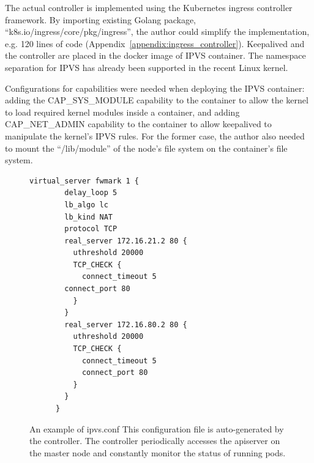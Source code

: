 The actual controller \cite{ktaka_ccmp_2017_826894} is implemented using the Kubernetes ingress controller \cite{K8sIngress2017} framework. 
By importing existing Golang package, \enquote{k8s.io/ingress/core/pkg/ingress}, the author could simplify the implementation, e.g. 
120 lines of code (Appendix~\ref{appendix:ingress_controller}).
%
Keepalived and the controller are placed in the docker image of IPVS container.
The namespace separation for IPVS has already been supported in the recent Linux kernel. 

Configurations for capabilities were needed when deploying the IPVS container: adding the CAP\_SYS\_MODULE capability 
to the container to allow the kernel to load required kernel modules inside a container, 
and adding CAP\_NET\_ADMIN capability to the container to allow keepalived to manipulate the kernel's IPVS rules. 
For the former case, the author also needed to mount the \enquote{/lib/module} of the node's file system on the container's file system.

\begin{figure}[h]
  \centering
  \begin{minipage}{0.6\columnwidth}
    \begin{lstlisting}[frame=lines,breaklines=true,basicstyle=\small\ttfamily]
      virtual_server fwmark 1 {
        delay_loop 5
        lb_algo lc
        lb_kind NAT
        protocol TCP
        real_server 172.16.21.2 80 {
          uthreshold 20000
          TCP_CHECK {
            connect_timeout 5
        connect_port 80
          }
        }
        real_server 172.16.80.2 80 {
          uthreshold 20000
          TCP_CHECK {
            connect_timeout 5
            connect_port 80
          }
        }
      }
    \end{lstlisting}
  \end{minipage}

  \par\bigskip
    \centering
    \begin{minipage}{0.9\columnwidth}
      \caption[An example of ipvs.conf]{
        An example of ipvs.conf
        This configuration file is auto-generated by the controller.
        The controller periodically accesses the apiserver on the master node and constantly monitor the status of running pods.
      }
      \label{fig:ipvs.conf}
    \end{minipage}
\end{figure}

